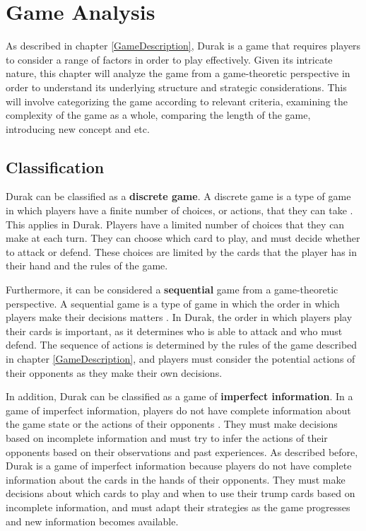 \chapter{Game Analysis}

As described in chapter \ref{GameDescription}, Durak is a game that requires players to consider a range of factors in order to play effectively. Given its intricate nature, this chapter will analyze the game from a game-theoretic perspective in order to understand its underlying structure and strategic considerations. This will involve categorizing the game according to relevant criteria, examining the complexity of the game as a whole, comparing the length of the game, introducing new concept and etc.

\section{Classification}

Durak can be classified as a \textbf{discrete game}. A discrete game is a type of game in which players have a finite number of choices, or actions, that they can take \citep{Gametheory4}. This applies in Durak. Players have a limited number of choices that they can make at each turn. They can choose which card to play, and must decide whether to attack or defend. These choices are limited by the cards that the player has in their hand and the rules of the game. 

Furthermore, it can be considered a \textbf{sequential} game from a game-theoretic perspective. A sequential game is a type of game in which the order in which players make their decisions matters \citep{Gametheory4}. In Durak, the order in which players play their cards is important, as it determines who is able to attack and who must defend. The sequence of actions is determined by the rules of the game described in chapter \ref{GameDescription}, and players must consider the potential actions of their opponents as they make their own decisions. 

In addition, Durak can be classified as a game of \textbf{imperfect information}. In a game of imperfect information, players do not have complete information about the game state or the actions of their opponents \citep{Gametheory4}. They must make decisions based on incomplete information and must try to infer the actions of their opponents based on their observations and past experiences. As described before, Durak is a game of imperfect information because players do not have complete information about the cards in the hands of their opponents. They must make decisions about which cards to play and when to use their trump cards based on incomplete information, and must adapt their strategies as the game progresses and new information becomes available.

